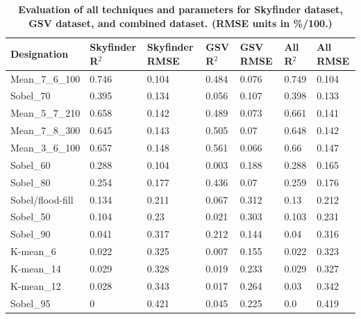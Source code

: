 \documentclass[final,3p,times,authoryear]{elsarticle}
\begin{document}
\begin{table}[!htbp]
\caption{\bf Evaluation of all techniques and parameters for Skyfinder dataset, GSV dataset, and combined dataset. (RMSE units in \%/100.) \label{tab:evalall}}     
\begin{tabular}{ l  l l l l l l}
\textbf{Designation}  & \textbf{Skyfinder R$^{2}$} & \textbf{Skyfinder RMSE} & \textbf{GSV R$^{2}$} & \textbf{GSV RMSE} & \textbf{All R$^{2}$} & \textbf{All RMSE} \\ \hline
Mean\_7\_6\_100	&0.746&0.104&0.484&0.076&0.749&0.104 \\
Sobel\_70 &0.395&0.134&0.056&0.107&0.398&0.133 \\
Mean\_5\_7\_210	&0.658&0.142&0.489&0.073&0.661&0.141 \\
Mean\_7\_8\_300 &0.645&0.143&0.505&0.07&0.648&0.142 \\
Mean\_3\_6\_100	&0.657&0.148&0.561&0.066&0.66&0.147 \\
Sobel\_60 &0.288&0.104&0.003&0.188&0.288&0.165 \\
Sobel\_80 &0.254&0.177&0.436&0.07&0.259&0.176 \\
Sobel/flood-fill &0.134&0.211&0.067&0.312&0.13&0.212 \\
Sobel\_50 &0.104&0.23&0.021&0.303&0.103&0.231 \\
Sobel\_90 &0.041&0.317&0.212&0.144&0.04&0.316 \\
K-mean\_6 &0.022&0.325&0.007&0.155&0.022&0.323 \\
K-mean\_14 &0.029&0.328&0.019&0.233&0.029&0.327 \\
K-mean\_12 &0.028&0.343&0.017&0.264&0.03&0.342 \\
Sobel\_95 &0&0.421&0.045&0.225&0.0&0.419 \\
\hline
\end{tabular}
\end{table}
\end{document}
